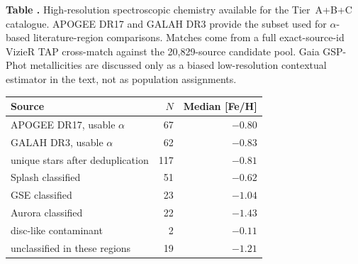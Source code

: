 ﻿\begin{center}
\label{tab:spectroscopic}
\begin{minipage}{\columnwidth}
\small\textbf{Table \thetable.} High-resolution spectroscopic chemistry
available for the Tier~A+B+C catalogue. APOGEE DR17
\citep{Abdurrauf2022} and GALAH DR3 \citep{Buder2021} provide the
subset used for $\alpha$-based literature-region comparisons. Matches
come from a full exact-source-id VizieR TAP cross-match against the
20{,}829-source candidate pool. Gaia GSP-Phot metallicities are
discussed only as a biased low-resolution contextual estimator in the
text, not as population assignments.
\end{minipage}
\vspace{0.4ex}

\small
\setlength{\tabcolsep}{4pt}
\begin{tabular}{lrr}
\hline\hline
Source & $N$ & Median [Fe/H] \\
\hline
APOGEE DR17, usable $\alpha$ & 67 & $-0.80$ \\
GALAH DR3, usable $\alpha$   & 62 & $-0.83$ \\
\quad{} unique stars after deduplication & 117 & $-0.81$ \\
\hline
Splash classified      &  51 & $-0.62$ \\
GSE classified          &  23 & $-1.04$ \\
Aurora classified       &  22 & $-1.43$ \\
disc-like contaminant   &   2 & $-0.11$ \\
unclassified in these regions & 19 & $-1.21$ \\
\hline
\end{tabular}
\end{center}
